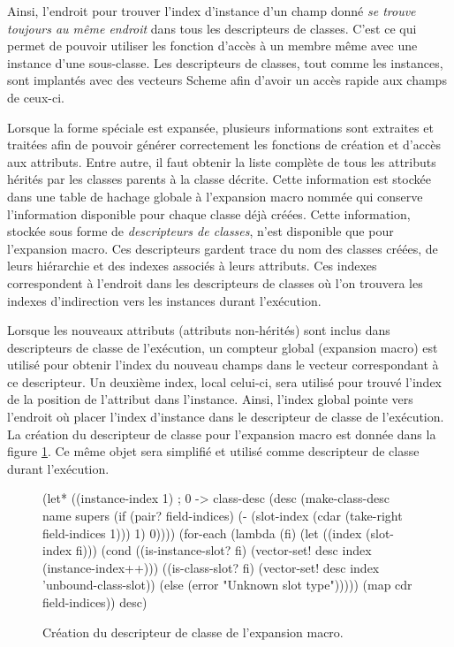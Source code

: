 \documentclass[12pt,oneside,letterpaper,francais]{book}
\newcommand{\scheme}[1]{\selectlanguage{english}{\tt #1}\selectlanguage{french}}
\begin{document}
Ainsi, l'endroit pour trouver l'index d'instance d'un champ donné
\emph{se trouve toujours au même endroit} dans tous les descripteurs
de classes. C'est ce qui permet de pouvoir utiliser les fonction
d'accès à un membre même avec une instance d'une sous-classe. Les
descripteurs de classes, tout comme les instances, sont implantés avec
des vecteurs Scheme afin d'avoir un accès rapide aux champs de ceux-ci.

Lorsque la forme spéciale \scheme{define-class} est expansée,
plusieurs informations sont extraites et traitées afin de pouvoir
générer correctement les fonctions de création et d'accès aux
attributs. Entre autre, il faut obtenir la liste complète de tous les
attributs hérités par les classes parents à la classe décrite. Cette
information est stockée dans une table de hachage globale à
l'expansion macro nommée \scheme{mt-class-table} qui conserve
l'information disponible pour chaque classe déjà créées. Cette
information, stockée sous forme de \emph{descripteurs de classes},
n'est disponible que pour l'expansion macro. Ces descripteurs gardent
trace du nom des classes créées, de leurs hiérarchie et des indexes
associés à leurs attributs. Ces indexes correspondent à l'endroit dans
les descripteurs de classes où l'on trouvera les indexes d'indirection
vers les instances durant l'exécution.

Lorsque les nouveaux attributs (attributs non-hérités) sont inclus
dans descripteurs de classe de l'exécution, un compteur global
(expansion macro) est utilisé pour obtenir l'index du nouveau champs
dans le vecteur correspondant à ce descripteur. Un deuxième index,
local celui-ci, sera utilisé pour trouvé l'index de la position de
l'attribut dans l'instance. Ainsi, l'index global pointe vers
l'endroit où placer l'index d'instance dans le descripteur de classe
de l'exécution. La création du descripteur de classe pour l'expansion
macro est donnée dans la figure \ref{OO:classdesc-code}. Ce même objet
sera simplifié et utilisé comme descripteur de classe durant
l'exécution.

\begin{figure}[htb!]
  \begin{schemecode}
(let* ((instance-index 1) ; 0 -> class-desc
       (desc (make-class-desc
              name supers
              (if (pair? field-indices)
                  (- (slot-index
                      (cdar (take-right field-indices 1)))
                     1)
                  0))))
  (for-each
   (lambda (fi)
     (let ((index (slot-index fi)))
       (cond ((is-instance-slot? fi)
              (vector-set! desc index (instance-index++)))
             ((is-class-slot? fi)
              (vector-set! desc index 'unbound-class-slot))
             (else
              (error "Unknown slot type")))))
   (map cdr field-indices))
  desc)
  \end{schemecode}
  \caption{Création du descripteur de classe de l'expansion macro.}
  \label{OO:classdesc-code}
\end{figure}
\end{document}

